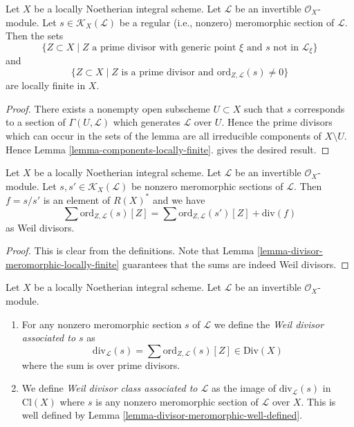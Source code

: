 \begin{lemma}
\label{lemma-divisor-meromorphic-locally-finite}
Let $X$ be a locally Noetherian integral scheme. Let $\mathcal{L}$ be an
invertible $\mathcal{O}_X$-module. Let $s \in \mathcal{K}_X(\mathcal{L})$ be a
regular (i.e., nonzero) meromorphic section of $\mathcal{L}$. Then the sets
$$
\{Z \subset X \mid Z \text{ a prime divisor with generic point }\xi
\text{ and }s\text{ not in }\mathcal{L}_\xi\}
$$
and
$$
\{Z \subset X \mid Z \text{ is a prime divisor and }
\text{ord}_{Z, \mathcal{L}}(s) \not = 0\}
$$
are locally finite in $X$.
\end{lemma}

\begin{proof}
There exists a nonempty open subscheme $U \subset X$ such that $s$
corresponds to a section of $\Gamma(U, \mathcal{L})$ which generates
$\mathcal{L}$ over $U$. Hence the prime divisors which can occur
in the sets of the lemma are all irreducible components of $X \setminus U$.
Hence Lemma \ref{lemma-components-locally-finite}.
gives the desired result.
\end{proof}

\begin{lemma}
\label{lemma-divisor-meromorphic-well-defined}
Let $X$ be a locally Noetherian integral scheme.
Let $\mathcal{L}$ be an invertible $\mathcal{O}_X$-module.
Let $s, s' \in \mathcal{K}_X(\mathcal{L})$ be nonzero
meromorphic sections of $\mathcal{L}$. Then $f = s/s'$
is an element of $R(X)^*$ and we have
$$
\sum \text{ord}_{Z, \mathcal{L}}(s)[Z]
=
\sum \text{ord}_{Z, \mathcal{L}}(s')[Z]
+
\text{div}(f)
$$
as Weil divisors.
\end{lemma}

\begin{proof}
This is clear from the definitions.
Note that Lemma \ref{lemma-divisor-meromorphic-locally-finite}
guarantees that the sums are indeed Weil divisors.
\end{proof}

\begin{definition}
\label{definition-divisor-invertible-sheaf}
Let $X$ be a locally Noetherian integral scheme.
Let $\mathcal{L}$ be an invertible $\mathcal{O}_X$-module.
\begin{enumerate}
\item For any nonzero meromorphic section $s$ of $\mathcal{L}$
we define the {\it Weil divisor associated to $s$} as
$$
\text{div}_\mathcal{L}(s) =
\sum \text{ord}_{Z, \mathcal{L}}(s) [Z] \in \text{Div}(X)
$$
where the sum is over prime divisors.
\item We define {\it Weil divisor class associated to $\mathcal{L}$}
as the image of $\text{div}_\mathcal{L}(s)$ in $\text{Cl}(X)$
where $s$ is any nonzero meromorphic section of $\mathcal{L}$ over
$X$. This is well defined by
Lemma \ref{lemma-divisor-meromorphic-well-defined}.
\end{enumerate}
\end{definition}

